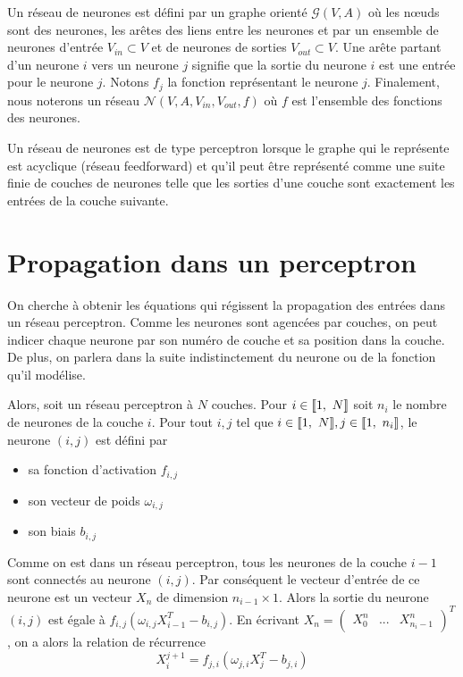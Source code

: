 \begin{definition} 
Un réseau de neurones est défini par un graphe orienté $\mathcal{G}(V, A)$ où les n\oe{}uds sont des neurones, les arêtes des liens entre les neurones et par un ensemble de neurones d'entrée $V_{in} \subset V$ et de neurones de sorties $V_{out} \subset V$. Une arête partant d'un neurone $i$ vers un neurone $j$ signifie que la sortie du neurone $i$ est une entrée pour le neurone $j$. Notons $f_{j}$ la fonction représentant le neurone $j$. Finalement, nous noterons un réseau $\mathcal{N}(V, A, V_{in}, V_{out}, f)$ où $f$ est l'ensemble des fonctions des neurones.\\
\end{definition}

\begin{definition}[Perceptron]
Un réseau de neurones est de type perceptron lorsque le graphe qui le représente est acyclique (réseau feedforward) et qu'il peut être représenté comme une suite finie de couches de neurones telle que les sorties d'une couche sont exactement les entrées de la couche suivante.
\end{definition} 

\section{Propagation dans un perceptron}

On cherche à obtenir les équations qui régissent la propagation des entrées dans un réseau perceptron. Comme les neurones sont agencées par couches, on peut indicer chaque neurone par son numéro de couche et sa position dans la couche. De plus, on parlera dans la suite indistinctement du neurone ou de la fonction qu'il modélise. 

Alors, soit un réseau perceptron à $N$ couches. Pour $i \in \llbracket 1,\ N \rrbracket$ soit $n_i$ le nombre de neurones de la couche $i$. Pour tout $i,j $ tel que $i \in \llbracket 1,\ N \rrbracket, j \in \llbracket 1,\ n_i \rrbracket$, le neurone $(i,j)$ est défini par 
\begin{itemize}
  \item sa fonction d'activation $f_{i,j}$ 
  \item son vecteur de poids $\omega_{i,j}$
  \item son biais $b_{i,j}$
\end{itemize}

Comme on est dans un réseau perceptron, tous les neurones de la couche $i-1$ sont connectés au neurone $(i,j)$. Par conséquent le vecteur d'entrée de ce neurone est un vecteur $X_n$ de dimension $n_{i-1} \times 1$. Alors la sortie du neurone $(i,j)$ est égale à $f_{i,j}(\omega_{i,j}X_{i-1}^T - b_{i,j})$. En écrivant $X_n = \begin{pmatrix}X_0^n & ... & X_{n_i-1}^n\end{pmatrix}^T$, on a alors la relation de récurrence 
\begin{equation}
  X_i^{j+1} = f_{j,i}(\omega_{j,i}X_j^T - b_{j,i})
  \label{equation_propagation_coefficients}
\end{equation}

